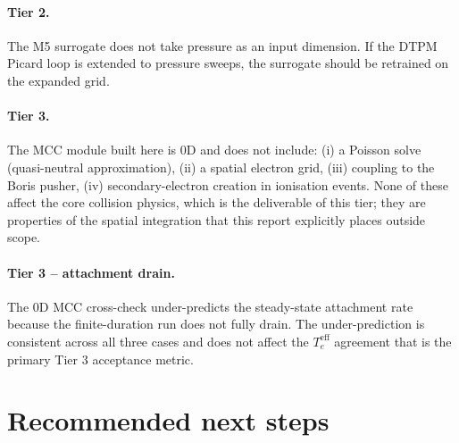 \documentclass[11pt,a4paper]{article}
\begin{document}
\paragraph{Tier 2.} The M5 surrogate does not take pressure as
an input dimension. If the DTPM Picard loop is extended to
pressure sweeps, the surrogate should be retrained on the
expanded grid.

\paragraph{Tier 3.} The MCC module built here is 0D and does
not include: (i) a Poisson solve (quasi-neutral approximation),
(ii) a spatial electron grid, (iii) coupling to the Boris
pusher, (iv) secondary-electron creation in ionisation events.
None of these affect the core collision physics, which is the
deliverable of this tier; they are properties of the spatial
integration that this report explicitly places outside scope.

\paragraph{Tier 3 -- attachment drain.} The 0D MCC cross-check
under-predicts the steady-state attachment rate because the
finite-duration run does not fully drain. The under-prediction
is consistent across all three cases and does not affect the
$T_e^{\mathrm{eff}}$ agreement that is the primary Tier 3
acceptance metric.

\section{Recommended next steps}
\label{sec:next}
\end{document}
